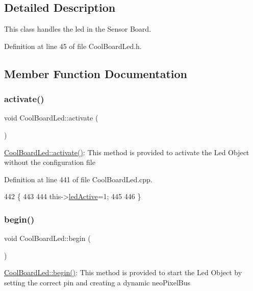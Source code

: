 \subsection{Detailed Description}
This class handles the led in the Sensor Board. 

Definition at line 45 of file Cool\+Board\+Led.\+h.



\subsection{Member Function Documentation}
\mbox{\label{class_cool_board_led_ae74fe4b47d06c3a97b468ba220c4eb99}} 
\subsubsection{\texorpdfstring{activate()}{activate()}}
{\footnotesize\ttfamily void Cool\+Board\+Led\+::activate (\begin{DoxyParamCaption}{ }\end{DoxyParamCaption})}

\hyperlink{class_cool_board_led_ae74fe4b47d06c3a97b468ba220c4eb99}{Cool\+Board\+Led\+::activate()}\+: This method is provided to activate the Led Object without the configuration file 

Definition at line 441 of file Cool\+Board\+Led.\+cpp.


\begin{DoxyCode}
442 \{
443 
444     this->\hyperlink{class_cool_board_led_aadd04d2ecf123247718d77f42fba7f08}{ledActive}=1;
445 
446 \}
\end{DoxyCode}
\mbox{\label{class_cool_board_led_ae3cbde8affcc6f011cbd698c8ef911f6}} 
\subsubsection{\texorpdfstring{begin()}{begin()}}
{\footnotesize\ttfamily void Cool\+Board\+Led\+::begin (\begin{DoxyParamCaption}{ }\end{DoxyParamCaption})}

\hyperlink{class_cool_board_led_ae3cbde8affcc6f011cbd698c8ef911f6}{Cool\+Board\+Led\+::begin()}\+: This method is provided to start the Led Object by setting the correct pin and creating a dynamic neo\+Pixel\+Bus 

